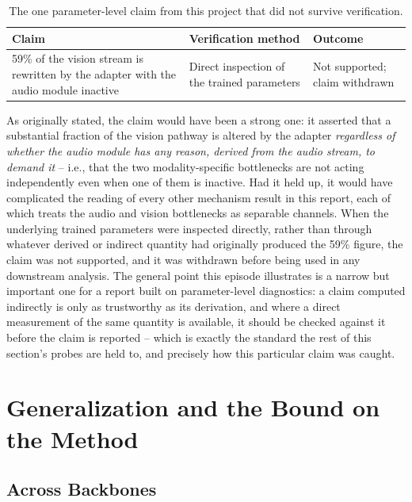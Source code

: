 \documentclass[11pt,a4paper,oneside]{article}
\renewcommand{\arraystretch}{1.15}
\begin{document}
\begin{table}[h]
\centering
\small
\renewcommand{\arraystretch}{1.3}
\begin{tabular}{p{5.0cm}p{4.3cm}p{3.3cm}}
\toprule
Claim & Verification method & Outcome \\
\midrule
59\% of the vision stream is rewritten by the adapter with the audio module inactive & Direct
inspection of the trained parameters & Not supported; claim withdrawn \\
\bottomrule
\end{tabular}
\caption{The one parameter-level claim from this project that did not survive verification.}
\label{tab:params}
\end{table}

As originally stated, the claim would have been a strong one: it asserted that a substantial fraction
of the vision pathway is altered by the adapter \emph{regardless of whether the audio module has any
reason, derived from the audio stream, to demand it} -- i.e., that the two modality-specific
bottlenecks are not acting independently even when one of them is inactive. Had it held up, it would
have complicated the reading of every other mechanism result in this report, each of which treats the
audio and vision bottlenecks as separable channels. When the underlying trained parameters were
inspected directly, rather than through whatever derived or indirect quantity had originally produced
the 59\% figure, the claim was not supported, and it was withdrawn before being used in any
downstream analysis. The general point this episode illustrates is a narrow but important one for a
report built on parameter-level diagnostics: a claim computed indirectly is only as trustworthy as its
derivation, and where a direct measurement of the same quantity is available, it should be checked
against it before the claim is reported -- which is exactly the standard the rest of this section's
probes are held to, and precisely how this particular claim was caught.

\clearpage
\section{Generalization and the Bound on the Method}
\label{sec:generalization}

\subsection{Across Backbones}
\label{sec:backbones}
\end{document}
